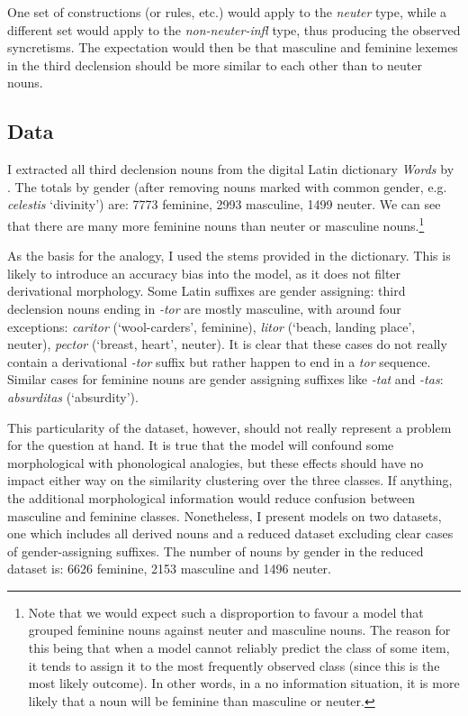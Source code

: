 One set of constructions (or rules, etc.) would apply to the \textit{neuter} type, while a different set would apply to the \textit{non-neuter-infl} type, thus producing the observed syncretisms. The expectation would then be that masculine and feminine lexemes in the third declension should be more similar to each other than to neuter nouns.

\subsection{Data}

I extracted all third declension nouns from the digital Latin dictionary \textit{Words} by \textcite{Whitaker.}. The totals by gender (after removing nouns marked with common gender, e.g. \textit{celestis} `divinity') are: 7773 feminine, 2993 masculine, 1499 neuter. We can see that there are many more feminine nouns than neuter or masculine nouns.\footnote{Note that we would expect such a disproportion to favour a model that grouped feminine nouns against neuter and masculine nouns. The reason for this being that when a model cannot reliably predict the class of some item, it tends to assign it to the most frequently observed class (since this is the most likely outcome). In other words, in a no information situation, it is more likely that a noun will be feminine than masculine or neuter.}

As the basis for the analogy, I used the stems provided in the dictionary. This is likely to introduce an accuracy bias into the model, as it does not filter derivational morphology. Some Latin suffixes are gender assigning: third declension nouns ending in \textit{-tor} are mostly masculine, with around four exceptions: \textit{caritor} (`wool-carders', feminine), \textit{litor} (`beach, landing place', neuter),  \textit{pector} (`breast, heart', neuter). It is clear that these cases do not really contain a derivational \textit{-tor} suffix but rather happen to end in a \textit{tor} sequence. Similar cases for feminine nouns are gender assigning suffixes like \textit{-tat} and \textit{-tas}: \textit{absurditas} (`absurdity').

This particularity of the dataset, however, should not really represent a problem for the question at hand. It is true that the model will confound some morphological with phonological analogies, but these effects should have no impact either way on the similarity clustering over the three classes. If anything, the additional morphological information would reduce confusion between masculine and feminine classes. Nonetheless, I present models on two datasets, one which includes all derived nouns and a reduced dataset excluding clear cases of gender-assigning suffixes. The number of nouns by gender in the reduced dataset is: 6626 feminine, 2153 masculine and 1496 neuter.

